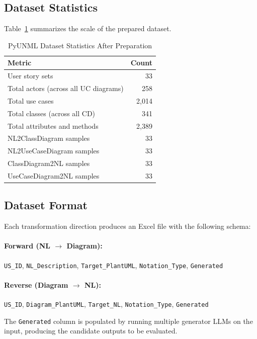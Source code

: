 \documentclass[lettersize,journal]{IEEEtran}
\begin{document}
\subsection{Dataset Statistics}

Table~\ref{tab:dataset-stats} summarizes the scale of the prepared dataset.

\begin{table}[!t]
\centering
\caption{PyUNML Dataset Statistics After Preparation}
\label{tab:dataset-stats}
\begin{tabular}{@{}lr@{}}
\toprule
\textbf{Metric} & \textbf{Count} \\
\midrule
User story sets & 33 \\
Total actors (across all UC diagrams) & 258 \\
Total use cases & 2{,}014 \\
Total classes (across all CD) & 341 \\
Total attributes and methods & 2{,}389 \\
\midrule
NL2ClassDiagram samples & 33 \\
NL2UseCaseDiagram samples & 33 \\
ClassDiagram2NL samples & 33 \\
UseCaseDiagram2NL samples & 33 \\
\bottomrule
\end{tabular}
\end{table}

\subsection{Dataset Format}

Each transformation direction produces an Excel file with the following schema:

\paragraph{Forward (NL $\rightarrow$ Diagram):}
\texttt{US\_ID}, \texttt{NL\_Description}, \texttt{Target\_PlantUML}, \texttt{Notation\_Type}, \texttt{Generated}

\paragraph{Reverse (Diagram $\rightarrow$ NL):}
\texttt{US\_ID}, \texttt{Diagram\_PlantUML}, \texttt{Target\_NL}, \texttt{Notation\_Type}, \texttt{Generated}

The \texttt{Generated} column is populated by running multiple generator LLMs on the input, producing the candidate outputs to be evaluated.
\end{document}
